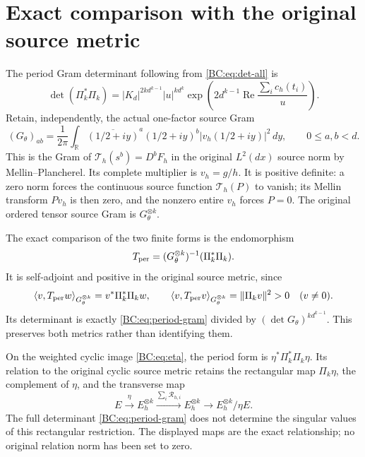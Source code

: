 \documentclass[11pt,a4paper]{article}
\begin{document}
\section{Exact comparison with the original source metric}

The period Gram determinant following from \eqref{BC:eq:det-all} is
\begin{equation}
 \det(\Pi_k^*\Pi_k)=|K_d|^{2k d^{k-1}}|u|^{k d^k}
    \exp\!\left(2d^{k-1}\operatorname{Re}
                    \frac{\sum_i c_h(t_i)}u\right).
 \label{BC:eq:period-gram}
\end{equation}
Retain, independently, the actual one-factor source Gram
\begin{equation}
 (G_\theta)_{ab}=\frac1{2\pi}\int_{\mathbb R}
     \overline{(1/2+iy)}^{a}(1/2+iy)^b
       |v_h(1/2+iy)|^2\,dy,\qquad 0\le a,b<d.
 \label{BC:eq:theta-gram}
\end{equation}
This is the Gram of $\mathcal T_h(s^b)=D^bF_h$ in the original
$L^2(dx)$ source norm by Mellin--Plancherel.  Its complete multiplier is
$v_h=g/h$.  It is positive definite: a zero norm forces the continuous
source function $\mathcal T_h(P)$ to vanish; its Mellin transform
$Pv_h$ is then zero, and the nonzero entire $v_h$ forces $P=0$.
The original ordered tensor source Gram is $G_\theta^{\otimes k}$.

The exact comparison of the two finite forms is the endomorphism
\begin{equation}
 T_{\rm per}=(G_\theta^{\otimes k})^{-1}(\Pi_k^*\Pi_k).
 \label{BC:eq:metric-map}
\end{equation}
It is self-adjoint and positive in the original source metric, since
\[
 \langle v,T_{\rm per}w\rangle_{G_\theta^{\otimes k}}
     =v^*\Pi_k^*\Pi_k w,
 \qquad
 \langle v,T_{\rm per}v\rangle_{G_\theta^{\otimes k}}
     =\|\Pi_kv\|^2>0\quad(v\ne0).
\]
Its determinant is exactly \eqref{BC:eq:period-gram} divided by
$(\det G_\theta)^{k d^{k-1}}$.  This preserves both metrics rather
than identifying them.

On the weighted cyclic image \eqref{BC:eq:eta}, the period form is
$\eta^*\Pi_k^*\Pi_k\eta$.  Its relation to the original cyclic
source metric retains the rectangular map $\Pi_k\eta$, the complement
of $\eta$, and the transverse map
\[
 E\xrightarrow{\eta}E_h^{\otimes k}
 \xrightarrow{\sum_i\mathcal R_{h,i}}E_h^{\otimes k}
 \longrightarrow E_h^{\otimes k}/\eta E.
\]
The full determinant \eqref{BC:eq:period-gram} does not determine the
singular values of this rectangular restriction.  The displayed maps
are the exact relationship; no original relation norm has been set to
zero.
\end{document}
